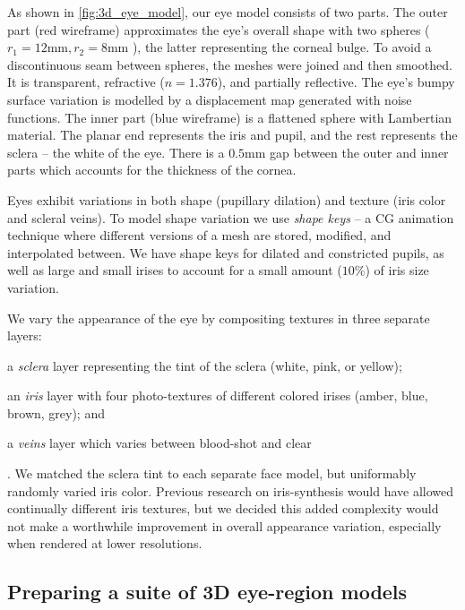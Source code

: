 As shown in \autoref{fig:3d_eye_model}, our eye model consists of two parts.
%
The outer part (red wireframe) approximates the eye's overall shape with two spheres ($r_1\!=\!12\textrm{mm}, r_2\!=\!8\textrm{mm}$ \cite{ruhland2014look}), the latter representing the corneal bulge. To avoid a discontinuous seam between spheres, the meshes were joined and then smoothed. It is transparent, refractive ($n\!=\!1.376$), and partially reflective. The eye's bumpy surface variation is modelled by a displacement map generated with noise functions.
%
The inner part (blue wireframe) is a flattened sphere with Lambertian material. The planar end represents the iris and pupil, and the rest represents the sclera -- the white of the eye.
%
There is a $0.5\textrm{mm}$ gap between the outer and inner parts which accounts for the thickness of the cornea. 

Eyes exhibit variations in both shape (pupillary dilation) and texture (iris color and scleral veins). To model shape variation we use \emph{shape keys} -- a CG animation technique where different versions of a mesh are stored, modified, and interpolated between. We have shape keys for dilated and constricted pupils, as well as large and small irises to account for a small amount ($10\%$) of iris size variation.

We vary the appearance of the eye by compositing textures in three separate layers:
\begin{inparaenum}
\item a \emph{sclera} layer representing the tint of the sclera (white, pink, or yellow);
\item an \emph{iris} layer with four photo-textures of different colored irises (amber, blue, brown, grey); and
\item a \emph{veins} layer which varies between blood-shot and clear
\end{inparaenum}. We matched the sclera tint to each separate face model, but uniformably randomly varied iris color. Previous research on iris-synthesis  would have allowed continually different iris textures, but we decided this added complexity would not make a worthwhile improvement in overall appearance variation, especially when rendered at lower resolutions.

\subsection{Preparing a suite of 3D eye-region models}

